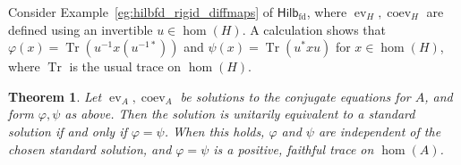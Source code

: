 \documentclass[a4paper,11pt]{article}
\theoremstyle{plain}
\newtheorem{theorem}[proposition]{Theorem}
\theoremstyle{remark}
\newenvironment{example}
  {\pushQED{\qed}\renewcommand{\qedsymbol}{$\triangle$}\examplex}
  {\popQED\endexamplex}
\newcommand{\catHilbFD}{\textsf{Hilb}_{\text{fd}}}
\newcommand{\ev}{\operatorname{ev}}
\newcommand{\coev}{\operatorname{coev}}
\newcommand{\tr}{\operatorname{Tr}}
\begin{document}
\begin{example}\label{eg:traces_hilb}
Consider Example~\ref{eg:hilbfd_rigid_diffmaps} of $\catHilbFD$, where $\ev_H, \coev_H$ are defined using an invertible $u\in\hom(H)$.  A calculation shows that $\varphi(x) = \tr(u^{-1}x(u^{-1*}))$ and $\psi(x) = \tr(u^*xu)$ for $x\in\hom(H)$, where $\tr$ is the usual trace on $\hom(H)$.
\end{example}

\begin{theorem}\label{thm:std_soln_iff_left_right_agree}
Let $\ev_A, \coev_A$ be solutions to the conjugate equations for $A$, and form $\varphi, \psi$ as above.  Then the solution is unitarily equivalent to a standard solution if and only if $\varphi = \psi$.  When this holds, $\varphi$ and $\psi$ are independent of the chosen standard solution, and $\varphi=\psi$ is a positive, faithful trace on $\hom(A)$.
\end{theorem}
\end{document}

